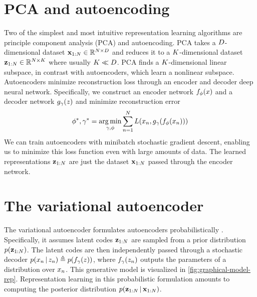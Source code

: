 \section{PCA and autoencoding}
Two of the simplest and most intuitive
representation learning algorithms
are principle component analysis (PCA)
and autoencoding.
PCA takes a $D$-dimensional dataset 
$\mathbf{x}_{1:N} \in \mathbb{R}^{N \times D}$ and
reduces it to a $K$-dimensional
dataset $\mathbf{z}_{1:N} \in \mathbb{R}^{N \times K}$
where usually $K \ll D$.
PCA finds a $K$-dimensional
linear subspace,
in contrast with autoencoders,
which learn a nonlinear subspace.
Autoencoders
minimize reconstruction loss
through an encoder
and decoder deep neural network.
Specifically, we construct
an encoder network $f_\phi(x)$
and a decoder network $g_\gamma(z)$
and minimize reconstruction error
\begin{align*}
\phi^*, \gamma^* = \operatorname*{arg\,min}_{\gamma, \phi} \sum _{n = 1}^N L(x_n, g_\gamma(f_\phi(x_n)))
\end{align*}
We can train autoencoders
with minibatch stochastic gradient descent,
enabling us to 
minimize this loss function
even with large amounts of data.
The learned representations 
$\mathbf{z}_{1:N}$ are just the dataset $\mathbf{x}_{1:N}$
passed through the encoder network.

\section{The variational autoencoder}
The variational autoencoder \citep[VAEs; ][]{Kingma2013, Rezende2014}
formulates autoencoders probabilistically .
Specifically, it
assumes
latent codes $\mathbf{z}_{1:N}$
are sampled from a
prior distribution $p(\mathbf{z}_{1:N})$.
The latent codes
are then independently passed through a stochastic decoder
$p(x_n \,|\, z_n) \triangleq p(f_\gamma(z))$,
where $f_\gamma(z_n)$ outputs
the parameters of a distribution over $x_n$.
This generative model is visualized in
\autoref{fig:graphical-model-rep}.
Representation learning in
this probabilistic formulation amounts to
computing the posterior distribution 
$p(\mathbf{z}_{1:N} \,|\, \mathbf{x}_{1:N})$.

